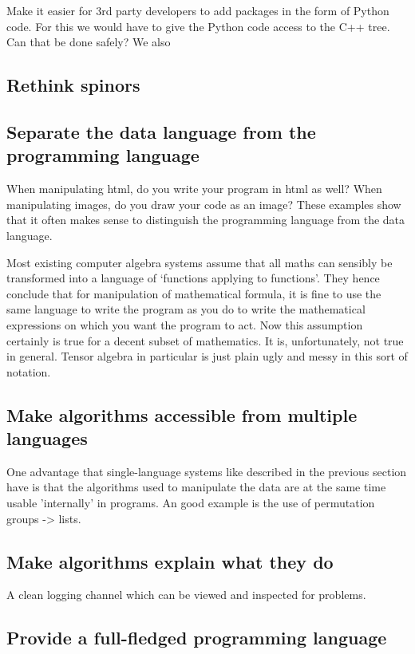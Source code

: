 \documentclass[11pt]{article}
\begin{document}
Make it easier for 3rd party developers to add packages in the form of
Python code. For this we would have to give the Python code access to
the C++ tree. Can that be done safely? We also 

\subsection{Rethink spinors}

\subsection{Separate the data language from the programming language}

When manipulating html, do you write your program in html as well?
When manipulating images, do you draw your code as an image? These
examples show that it often makes sense to distinguish the programming
language from the data language.

Most existing computer algebra systems assume that all maths can
sensibly be transformed into a language of `functions applying to
functions'. They hence conclude that for manipulation of mathematical
formula, it is fine to use the same language to write the program as
you do to write the mathematical expressions on which you want the
program to act. Now this assumption certainly is true for a decent
subset of mathematics. It is, unfortunately, not true in
general. Tensor algebra in particular is just plain ugly and messy in
this sort of notation.


\subsection{Make algorithms accessible from multiple languages}

One advantage that single-language systems like described in the
previous section have is that the algorithms used to manipulate the
data are at the same time usable 'internally' in programs. An good
example is the use of permutation groups -> lists.

\subsection{Make algorithms explain what they do}

A clean logging channel which can be viewed and inspected for problems.


\subsection{Provide a full-fledged programming language}
\end{document}

